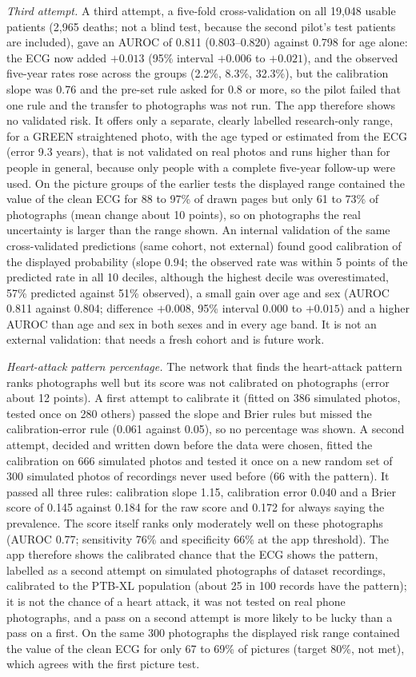 \documentclass[conference]{IEEEtran}
\begin{document}
\emph{Third attempt.} A third attempt, a five-fold cross-validation on all 19{,}048 usable patients (2{,}965 deaths; not a blind test, because the second pilot's test patients are included), gave an AUROC of 0.811 (0.803--0.820) against 0.798 for age alone: the ECG now added $+0.013$ (95\% interval $+0.006$ to $+0.021$), and the observed five-year rates rose across the groups (2.2\%, 8.3\%, 32.3\%), but the calibration slope was 0.76 and the pre-set rule asked for 0.8 or more, so the pilot failed that one rule and the transfer to photographs was not run. The app therefore shows no validated risk. It offers only a separate, clearly labelled research-only range, for a GREEN straightened photo, with the age typed or estimated from the ECG (error 9.3 years), that is not validated on real photos and runs higher than for people in general, because only people with a complete five-year follow-up were used. On the picture groups of the earlier tests the displayed range contained the value of the clean ECG for 88 to 97\% of drawn pages but only 61 to 73\% of photographs (mean change about 10 points), so on photographs the real uncertainty is larger than the range shown. An internal validation of the same cross-validated predictions (same cohort, not external) found good calibration of the displayed probability (slope 0.94; the observed rate was within 5 points of the predicted rate in all 10 deciles, although the highest decile was overestimated, 57\% predicted against 51\% observed), a small gain over age and sex (AUROC 0.811 against 0.804; difference $+0.008$, 95\% interval 0.000 to $+0.015$) and a higher AUROC than age and sex in both sexes and in every age band. It is not an external validation: that needs a fresh cohort and is future work.

\emph{Heart-attack pattern percentage.} The network that finds the heart-attack pattern ranks photographs well but its score was not calibrated on photographs (error about 12 points). A first attempt to calibrate it (fitted on 386 simulated photos, tested once on 280 others) passed the slope and Brier rules but missed the calibration-error rule (0.061 against 0.05), so no percentage was shown. A second attempt, decided and written down before the data were chosen, fitted the calibration on 666 simulated photos and tested it once on a new random set of 300 simulated photos of recordings never used before (66 with the pattern). It passed all three rules: calibration slope 1.15, calibration error 0.040 and a Brier score of 0.145 against 0.184 for the raw score and 0.172 for always saying the prevalence. The score itself ranks only moderately well on these photographs (AUROC 0.77; sensitivity 76\% and specificity 66\% at the app threshold). The app therefore shows the calibrated chance that the ECG shows the pattern, labelled as a second attempt on simulated photographs of dataset recordings, calibrated to the PTB-XL population (about 25 in 100 records have the pattern); it is not the chance of a heart attack, it was not tested on real phone photographs, and a pass on a second attempt is more likely to be lucky than a pass on a first. On the same 300 photographs the displayed risk range contained the value of the clean ECG for only 67 to 69\% of pictures (target 80\%, not met), which agrees with the first picture test.
\end{document}

